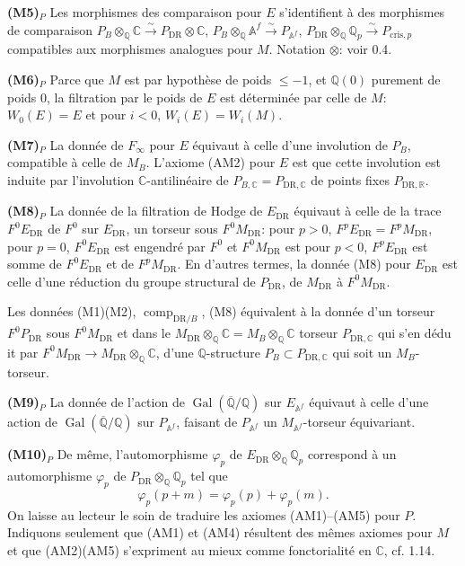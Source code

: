 \documentclass[12pt,a4paper]{article}
\theoremstyle{plain}
\theoremstyle{definition}
\theoremstyle{remark}
\DeclareMathOperator{\Gal}{Gal}
\providecommand{\Gal}{\operatorname{Gal}}
\providecommand{\DR}{\mathrm{DR}}
\providecommand{\cris}{\mathrm{cris}}
\providecommand{\comp}{\operatorname{comp}}
\begin{document}
\textbf{(M5)$_P$} Les morphismes des comparaison pour $E$ s'identifient \`a des morphismes
de comparaison $P_B \otimes_{\mathbb{Q}} \mathbb{C} \xrightarrow{\sim} P_{\DR} \otimes
\mathbb{C}$, $P_B \otimes_{\mathbb{Q}} \mathbb{A}^f \xrightarrow{\sim}
P_{\mathbb{A}^f}$, $P_{\DR} \otimes_{\mathbb{Q}} \mathbb{Q}_p \xrightarrow{\sim}
P_{\cris,p}$ compatibles aux morphismes analogues pour $M$. Notation $\otimes$: voir 0.4.

\textbf{(M6)$_P$} Parce que $M$ est par hypoth\`ese de poids $\leq -1$, et
$\mathbb{Q}(0)$ purement de poids $0$, la filtration par le poids de $E$ est
d\'etermin\'ee par celle de $M$: $W_0(E) = E$ et pour $i < 0$, $W_i(E) = W_i(M)$.

\textbf{(M7)$_P$} La donn\'ee de $F_\infty$ pour $E$ \'equivaut \`a celle d'une involution
de $P_B$, compatible \`a celle de $M_B$. L'axiome (AM2) pour $E$ est que cette
involution est induite par l'involution $\mathbb{C}$-antilin\'eaire de $P_{B,\mathbb{C}} =
P_{\DR,\mathbb{C}}$ de points fixes $P_{\DR,\mathbb{R}}$.

\textbf{(M8)$_P$} La donn\'ee de la filtration de Hodge de $E_{\DR}$ \'equivaut \`a celle
de la trace $F^0 E_{\DR}$ de $F^0$ sur $E_{\DR}$, un torseur sous $F^0 M_{\DR}$: pour
$p > 0$, $F^p E_{\DR} = F^p M_{\DR}$, pour $p = 0$, $F^0 E_{\DR}$ est engendr\'e par
$F^0$ et $F^0 M_{\DR}$ est pour $p < 0$, $F^p E_{\DR}$ est somme de $F^0 E_{\DR}$ et de
$F^p M_{\DR}$. En d'autres termes, la donn\'ee (M8) pour $E_{\DR}$ est celle d'une
r\'eduction du groupe structural de $P_{\DR}$, de $M_{\DR}$ \`a $F^0 M_{\DR}$.

Les donn\'ees (M1)(M2), $\comp_{\DR/B}$, (M8) \'equivalent \`a la donn\'ee d'un torseur
$F^0 P_{\DR}$ sous $F^0 M_{\DR}$ et dans le $M_{\DR} \otimes_{\mathbb{Q}} \mathbb{C} = M_B
\otimes_{\mathbb{Q}} \mathbb{C}$ torseur $P_{\DR,\mathbb{C}}$ qui s'en d\'edu it par
$F^0 M_{\DR} \to M_{\DR} \otimes_{\mathbb{Q}} \mathbb{C}$, d'une $\mathbb{Q}$-structure $P_B
\subset P_{\DR,\mathbb{C}}$ qui soit un $M_B$-torseur.

\textbf{(M9)$_P$} La donn\'ee de l'action de $\Gal(\overline{\mathbb{Q}}/\mathbb{Q})$ sur
$E_{\mathbb{A}^f}$ \'equivaut \`a celle d'une action de
$\Gal(\overline{\mathbb{Q}}/\mathbb{Q})$ sur $P_{\mathbb{A}^f}$, faisant de
$P_{\mathbb{A}^f}$ un $M_{\mathbb{A}^f}$-torseur \'equivariant.

\textbf{(M10)$_P$} De m\^eme, l'automorphisme $\varphi_p$ de $E_{\DR} \otimes_{\mathbb{Q}}
\mathbb{Q}_p$ correspond \`a un automorphisme $\varphi_p$ de $P_{\DR} \otimes_{\mathbb{Q}}
\mathbb{Q}_p$ tel que
\[
\varphi_p(p + m) = \varphi_p(p) + \varphi_p(m).
\]
On laisse au lecteur le soin de traduire les axiomes (AM1)--(AM5) pour $P$. Indiquons
seulement que (AM1) et (AM4) r\'esultent des m\^emes axiomes pour $M$ et que (AM2)(AM5)
s'expriment au mieux comme fonctorialit\'e en $\mathbb{C}$, cf. 1.14.
\end{document}
